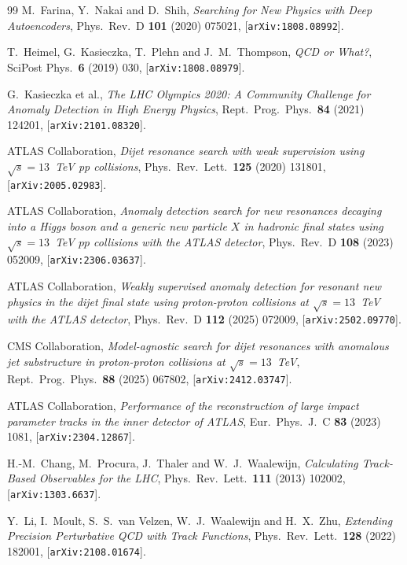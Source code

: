 \documentclass[a4paper,11pt]{article}
\begin{document}
\begin{thebibliography}{99}
M.~Farina, Y.~Nakai and D.~Shih,
\emph{Searching for New Physics with Deep Autoencoders},
Phys.\ Rev.\ D \textbf{101} (2020) 075021, [\texttt{arXiv:1808.08992}].

T.~Heimel, G.~Kasieczka, T.~Plehn and J.~M.~Thompson,
\emph{QCD or What?},
SciPost Phys.\ \textbf{6} (2019) 030, [\texttt{arXiv:1808.08979}].

G.~Kasieczka et al.,
\emph{The LHC Olympics 2020: A Community Challenge for Anomaly
Detection in High Energy Physics},
Rept.\ Prog.\ Phys.\ \textbf{84} (2021) 124201,
[\texttt{arXiv:2101.08320}].

ATLAS Collaboration,
\emph{Dijet resonance search with weak supervision using
$\sqrt{s}=13$~TeV pp collisions},
Phys.\ Rev.\ Lett.\ \textbf{125} (2020) 131801,
[\texttt{arXiv:2005.02983}].

ATLAS Collaboration,
\emph{Anomaly detection search for new resonances decaying into a Higgs
boson and a generic new particle $X$ in hadronic final states using
$\sqrt{s} = 13$~TeV $pp$ collisions with the ATLAS detector},
Phys.\ Rev.\ D \textbf{108} (2023) 052009,
[\texttt{arXiv:2306.03637}].

ATLAS Collaboration,
\emph{Weakly supervised anomaly detection for resonant new physics in
the dijet final state using proton-proton collisions at
$\sqrt{s} = 13$~TeV with the ATLAS detector},
Phys.\ Rev.\ D \textbf{112} (2025) 072009,
[\texttt{arXiv:2502.09770}].

CMS Collaboration,
\emph{Model-agnostic search for dijet resonances with anomalous jet
substructure in proton-proton collisions at $\sqrt{s} = 13$~TeV},
Rept.\ Prog.\ Phys.\ \textbf{88} (2025) 067802,
[\texttt{arXiv:2412.03747}].

ATLAS Collaboration,
\emph{Performance of the reconstruction of large impact parameter tracks
in the inner detector of ATLAS},
Eur.\ Phys.\ J.\ C \textbf{83} (2023) 1081,
[\texttt{arXiv:2304.12867}].

H.-M.~Chang, M.~Procura, J.~Thaler and W.~J.~Waalewijn,
\emph{Calculating Track-Based Observables for the LHC},
Phys.\ Rev.\ Lett.\ \textbf{111} (2013) 102002,
[\texttt{arXiv:1303.6637}].

Y.~Li, I.~Moult, S.~S.~van Velzen, W.~J.~Waalewijn and H.~X.~Zhu,
\emph{Extending Precision Perturbative QCD with Track Functions},
Phys.\ Rev.\ Lett.\ \textbf{128} (2022) 182001,
[\texttt{arXiv:2108.01674}].


\end{thebibliography}
\end{document}
